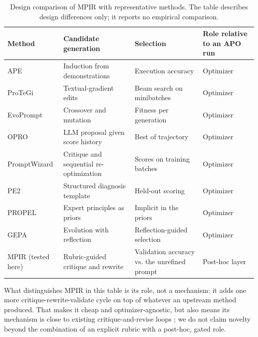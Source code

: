 \documentclass{ieeeaccess}
\begin{document}
\begin{table}[htbp]
\centering
\small
\caption{Design comparison of MPIR with representative methods. The table describes design differences only; it reports no empirical comparison.}
\begin{tabular}{>{\raggedright\arraybackslash}p{}>{\raggedright\arraybackslash}p{}>{\raggedright\arraybackslash}p{}>{\raggedright\arraybackslash}p{}}
\toprule
\textbf{Method} & \textbf{Candidate generation} & \textbf{Selection} & \textbf{Role relative to an APO run} \\
\midrule
APE \cite{zhou2023} & Induction from demonstrations & Execution accuracy & Optimizer \\
ProTeGi \cite{pryzant2023} & Textual-gradient edits & Beam search on minibatches & Optimizer \\
EvoPrompt \cite{guo2024} & Crossover and mutation & Fitness per generation & Optimizer \\
OPRO \cite{yang2024} & LLM proposal given score history & Best of trajectory & Optimizer \\
PromptWizard \cite{agarwal2025} & Critique and sequential re-optimization & Scores on training batches & Optimizer \\
PE2 \cite{ye2024} & Structured diagnosis template & Held-out scoring & Optimizer \\
PROPEL \cite{mayilvaghanan2025} & Expert principles as priors & Implicit in the priors & Optimizer \\
GEPA \cite{agrawal2026} & Evolution with reflection & Reflection-guided selection & Optimizer \\
MPIR (tested here) & Rubric-guided critique and rewrite & Validation accuracy vs. the unrefined prompt & Post-hoc layer \\
\bottomrule
\end{tabular}
\end{table}

What distinguishes MPIR in this table is its role, not a mechanism: it adds one more critique-rewrite-validate cycle on top of whatever an upstream method produced. That makes it cheap and optimizer-agnostic, but also means its mechanism is close to existing critique-and-revise loops \cite{pryzant2023,ye2024,madaan2023}; we do not claim novelty beyond the combination of an explicit rubric with a post-hoc, gated role.
\end{document}
